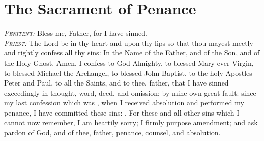 \section{The Sacrament of Penance}
\elcol{}{}
\textit{\scshape Penitent:} Bless me, Father, for I have sinned.\\
\textit{\scshape Priest:} The Lord be in thy heart and upon thy lips so that thou mayest meetly and rightly confess all thy sins: In the Name of the Father, {} and of the Son, and of the Holy Ghost. Amen.
I confess to God Almighty, to blessed Mary ever-Virgin, to blessed Michael the Archangel, to blessed John Baptist, to the holy Apostles Peter and Paul, to all the Saints, and to thee, father, that I have sinned exceedingly in thought, word, deed, and omission; by mine own great fault: since my last confession which was , when I received absolution and performed my penance, I have committed these sins: . For these and all other sins which I cannot now remember, I am heartily sorry; I firmly purpose amendment; and ask pardon of God, and of thee, father, penance, counsel, and absolution.
